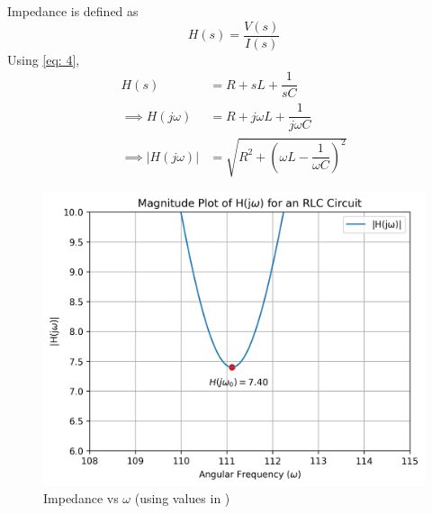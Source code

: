 \documentclass[journal,12pt,twocolumn]{IEEEtran}
\theoremstyle{remark}
\begin{document}
\begin{enumerate}
Impedance is defined as
\begin{equation}
    H(s) = \dfrac{V(s)}{I(s)}
\end{equation}
Using \eqref{eq: 4},
\begin{align}
     H(s) &= R + sL + \dfrac{1}{sC}\\
     \implies H(j\omega) &= R + j\omega L + \dfrac{1}{j\omega C}\\
     \implies \lvert H(j\omega) \rvert &= \sqrt{R^2 + \left(\omega L - \dfrac{1}{\omega C}\right)^2}
\end{align}
\begin{figure}[!h]
    \centering
    \includegraphics[width = \columnwidth]{figs/h_plot.png}
    \caption{Impedance vs $\omega$ (using values in )}
    \label{fig:h_plot}
\end{figure}
\end{enumerate}
\end{document}
